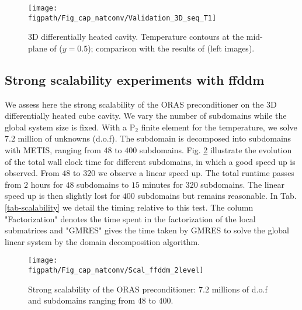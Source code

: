 \begin{figure}%
\begin{minipage}{\linewidth}
\begin{center}
 {\texttt{[image: \\figpath/Fig\_cap\_natconv/Validation\_3D\_seq\_T1]}}
\end{center}
\end{minipage}
\caption{3D differentially heated cavity. Temperature contours at the mid-plane of ($y=0.5$); comparison with the results of \cite{Wakashima-2004} (left images). }
\label{fig-3DT} 
\end{figure}

\subsection{Strong scalability experiments with ffddm} \label{sub-scal-ffddm}
We assess here the strong scalability of the ORAS preconditioner on the 3D differentially heated cube cavity.
We vary the number of subdomains while the global system size is fixed.
With a P$_2$ finite element for the temperature, we solve $7.2$ million of unknowns (d.o.f).
The subdomain is decomposed into subdomains with METIS, ranging from $48$ to $400$ subdomains.
Fig. \ref{fig-scalability} illustrate the evolution of the total wall clock time for different subdomains, in which a good speed up is observed.
From $48$ to $320$ we observe a linear speed up. 
The total runtime passes from $2$ hours for $48$ subdomains to $15$ minutes for $320$ subdomains.
The linear speed up is then slightly lost for $400$ subdomains but remains reasonable.
In Tab. \ref{tab-scalability} we detail the timing relative to this test.
The column "Factorization" denotes the time spent in the factorization of the local submatrices and "GMRES" gives the time taken by GMRES to solve the global linear system
by the domain decomposition algorithm.

\begin{figure}%
\begin{minipage}{\linewidth}
\begin{center}
 {\texttt{[image: \\figpath/Fig\_cap\_natconv/Scal\_ffddm\_2level]}}
\end{center}
\end{minipage}
\caption{Strong scalability of the ORAS preconditioner: $7.2$ millions of d.o.f and subdomains ranging from $48$ to $400$.}
\label{fig-scalability} 
\end{figure}

